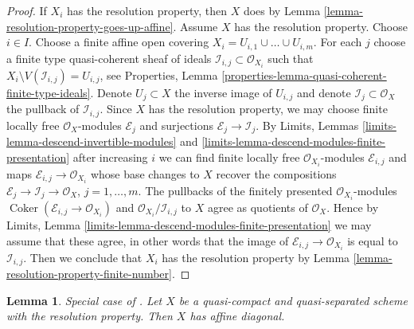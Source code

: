 \documentclass{stacks-project}
\newenvironment{reference}{\comment}{\endcomment}
\theoremstyle{plain}
\newtheorem{lemma}[subsection]{Lemma}
\theoremstyle{definition}
\theoremstyle{remark}
\numberwithin{equation}{subsection}
\def\Coker{\mathop{\mathrm{Coker}}}
\begin{document}
\begin{proof}
If $X_i$ has the resolution property, then $X$ does by
Lemma \ref{lemma-resolution-property-goes-up-affine}.
Assume $X$ has the resolution property.
Choose $i \in I$. Choose a finite affine open covering
$X_i = U_{i, 1} \cup \ldots \cup U_{i, m}$.
For each $j$ choose a finite type quasi-coherent sheaf
of ideals $\mathcal{I}_{i, j} \subset \mathcal{O}_{X_i}$
such that $X_i \setminus V(\mathcal{I}_{i, j}) = U_{i, j}$, see
Properties, Lemma \ref{properties-lemma-quasi-coherent-finite-type-ideals}.
Denote $U_j \subset X$ the inverse image of $U_{i, j}$
and denote $\mathcal{I}_j \subset \mathcal{O}_X$
the pullback of $\mathcal{I}_{i, j}$.
Since $X$ has the resolution property, we may
choose finite locally free $\mathcal{O}_X$-modules $\mathcal{E}_j$
and surjections $\mathcal{E}_j \to \mathcal{I}_j$.
By Limits, Lemmas \ref{limits-lemma-descend-invertible-modules} and
\ref{limits-lemma-descend-modules-finite-presentation}
after increasing $i$ we can find finite locally free
$\mathcal{O}_{X_i}$-modules $\mathcal{E}_{i, j}$
and maps $\mathcal{E}_{i, j} \to \mathcal{O}_{X_i}$
whose base changes to $X$ recover the compositions
$\mathcal{E}_j \to \mathcal{I}_j \to \mathcal{O}_X$, $j = 1, \ldots, m$.
The pullbacks of the finitely presented $\mathcal{O}_{X_i}$-modules
$\Coker(\mathcal{E}_{i, j} \to \mathcal{O}_{X_i})$
and $\mathcal{O}_{X_i}/\mathcal{I}_{i, j}$
to $X$ agree as quotients of $\mathcal{O}_X$.
Hence by Limits, Lemma
\ref{limits-lemma-descend-modules-finite-presentation}
we may assume that these agree, in other words that
the image of $\mathcal{E}_{i, j} \to \mathcal{O}_{X_i}$
is equal to $\mathcal{I}_{i, j}$.
Then we conclude that $X_i$ has the resolution property
by Lemma \ref{lemma-resolution-property-finite-number}.
\end{proof}

\begin{lemma}
\label{lemma-resolution-property-affine-diagonal}
\begin{reference}
Special case of \cite[Proposition 1.3]{totaro_resolution}.
\end{reference}
Let $X$ be a quasi-compact and quasi-separated scheme with
the resolution property. Then $X$ has affine diagonal.
\end{lemma}
\end{document}
